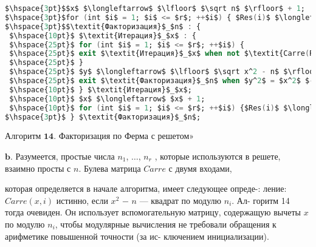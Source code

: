 \begin{lstlisting}[mathescape=true, language=Ada]
$\hspace{3pt}$$x$ $\longleftarrow$ $\lfloor$ $\sqrt n$ $\rfloor$ + 1;
$\hspace{3pt}$for (int $i$ = 1; $i$ <= $r$; ++$i$) { $Res(i)$ $\longleftarrow$ $x$ mod $n_i$; }
$\hspace{3pt}$$\textit{Факторизация}$_$n$ : {
 $\hspace{10pt}$ $\textit{Итерация}$_$x$ : {
 $\hspace{25pt}$ for (int $i$ = 1; $i$ <= $r$; ++$i$) {
 $\hspace{25pt}$ exit $\textit{Итерация}$_$x$ when not $\textit{Carre(Res(i), i);}$
 $\hspace{25pt}$ }
 $\hspace{25pt}$ $y$ $\longleftarrow$ $\lfloor$ $\sqrt x^2 - n$ $\rfloor$ + 1;
 $\hspace{25pt}$ exit $\textit{Факторизация}$_$n$ when $y^2$ = $x^2$ $-$ $n$;
 $\hspace{10pt}$ } $\textit{Итерация}$_$x$;
 $\hspace{10pt}$ $x$ $\longleftarrow$ $x$ + 1;
 $\hspace{10pt}$ for (int $i$ = 1; $i$ <= $r$; ++$i$) {$Res(i)$ $\longleftarrow$ $Res(i)$ + 1 mod $n_i$; }
$\hspace{3pt}$ } $\textit{Факторизация}$_$n$;
\end{lstlisting}
\begin{center}
$\mathbf{Алгоритм}$ $\mathbf{14.}$ Факторизация по Ферма с решетом»
\end{center}

$\mathbf{b.}$ Разумеется, простые числа $n_1$, $\dots$, $n_r$ , которые используются в \linebreak
решете, взаимно просты с $n$. Булева матрица $Carre$ с двумя входами, \linebreak

\newpage


\noindent которая определяется в начале алгоритма, имеет следующее опреде-: \linebreak
ление: $Carre(x, i)$ истинно, если $x^{2}$ $-$ $n$ --- квадрат по модулю $n_{i}$. Ал­- \linebreak
горитм 14 тогда очевиден. Он использует вспомогательную матрицу, \linebreak
содержащую вычеты $x$ по модулю $n_{i}$, чтобы модулярные вычисления \linebreak
не требовали обращения к арифметике повышенной точности (за ис­- \linebreak
ключением инициализации).

